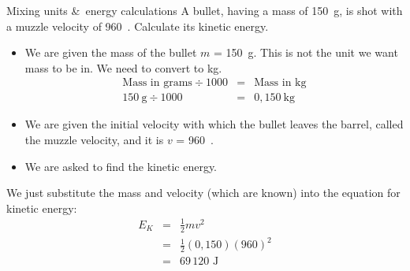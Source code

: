       \noindent
\begin{wex}{Mixing units \&\ energy calculations }{A bullet, having a mass of 150~g, is shot with a muzzle velocity of 960~\ms. Calculate its kinetic energy.}
{
\begin{itemize}
\item We are given the mass of the bullet $m$ = 150~g. This is not the
unit we want mass to be in. We need to convert to kg.
\begin{eqnarray*}
\text{Mass in grams} \div 1000 &=& \text{Mass in kg}\\
150~\text{g} \div 1000 &=& 0,150~\text{kg}
\end{eqnarray*}

\item We are given the initial velocity with which the bullet leaves the barrel, called the muzzle velocity, and it is $v$ = 960~\ms.
\end{itemize}
\begin{itemize}
\item We are asked to find the kinetic energy.
\end{itemize}

We just substitute the mass and velocity (which are known) into the equation for kinetic energy:
\begin{eqnarray*}
E_{K} & = & \frac{1}{2}mv^2 \\
&= & \frac{1}{2}(0,150)(960)^2 \\
&=& 69\,120 \text{ J}
\end{eqnarray*}}
\end{wex}
    \noindent


